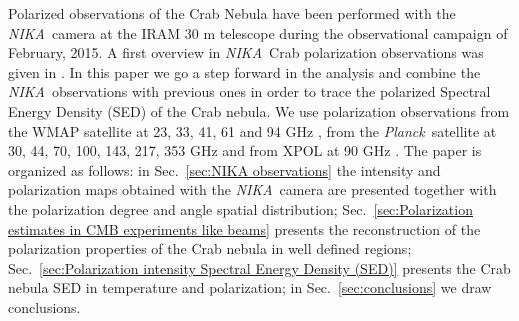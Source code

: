 \documentclass[twocolumn,traditabstract]{aa}
\def\NIKA{\textit{NIKA}}
\def\Planck{\textit{Planck}}
\begin{document}
Polarized observations of the Crab Nebula have been performed with the \NIKA\ camera \citep{monfardini2010,catalano2014,monfardini2014} at the IRAM 30 m telescope during the observational campaign of February, 2015. A first overview in \NIKA\ Crab polarization observations was given in \cite{2016JLTP..184..724R}. In this paper we go a step forward in the analysis and combine the \NIKA\ observations with previous ones
in order to trace the polarized Spectral Energy Density (SED) of the Crab nebula. We use polarization observations from the WMAP satellite at 23, 33, 41, 61 and 94 GHz \citep{2011ApJS..192...19W}, from the \Planck\ satellite at 30, 44, 70, 100, 143, 217, 353 GHz and from XPOL at 90 GHz \citep{aumont2010}. 
 The paper is organized as follows: in Sec.~\ref{sec:NIKA observations} the intensity and polarization maps obtained with the \NIKA\ camera are presented together with the polarization degree and angle spatial distribution; Sec.~\ref{sec:Polarization estimates in CMB experiments like beams} presents the reconstruction of the polarization properties of the Crab nebula in well defined regions; Sec.~\ref{sec:Polarization intensity Spectral Energy Density (SED)} presents the Crab nebula SED in temperature and polarization; in Sec.~\ref{sec:conclusions} we draw conclusions.
\end{document}
